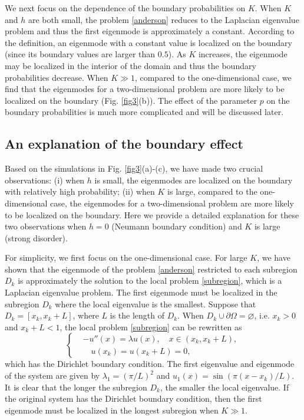 \documentclass[a4paper,11pt]{article}
\begin{document}
We next focus on the dependence of the boundary probabilities on $K$. When $K$ and $h$ are both small, the problem \eqref{anderson} reduces to the Laplacian eigenvalue problem and thus the first eigenmode is approximately a constant. According to the definition, an eigenmode with a constant value is localized on the boundary (since its boundary values are larger than $0.5$). As $K$ increases, the eigenmode may be localized in the interior of the domain and thus the boundary probabilities decrease. When $K\gg 1$, compared to the one-dimensional case, we find that the eigenmodes for a two-dimensional problem are more likely to be localized on the boundary (Fig. \ref{fig3}(b)). The effect of the parameter $p$ on the boundary probabilities is much more complicated and will be discussed later.

\subsection{An explanation of the boundary effect}
Based on the simulations in Fig. \ref{fig3}(a)-(c), we have made two crucial observations: (i) when $h$ is small, the eigenmodes are localized on the boundary with relatively high probability; (ii) when $K$ is large, compared to the one-dimensional case, the eigenmodes for a two-dimensional problem are more likely to be localized on the boundary. Here we provide a detailed explanation for these two observations when $h = 0$ (Neumann boundary condition) and $K$ is large (strong disorder).

For simplicity, we first focus on the one-dimensional case. For large $K$, we have shown that the eigenmode of the problem \eqref{anderson} restricted to each subregion $D_k$ is approximately the solution to the local problem \eqref{subregion}, which is a Laplacian eigenvalue problem. The first eigenmode must be localized in the subregion $D_k$ where the local eigenvalue is the smallest. Suppose that $D_k = [x_k, x_k+L]$, where $L$ is the length of $D_k$. When $D_k \cup \partial \Omega = \varnothing$, i.e. $x_k>0$ and $x_k+L<1$, the local problem \eqref{subregion} can be rewritten as
\begin{equation}\label{regionD}
\left\{
\begin{split}
& - u''(x) = \lambda u(x), \quad x \in (x_k, x_k+L), \\
& \quad u(x_k) = u(x_k+L) = 0,
\end{split}
\right.
\end{equation}
which has the Dirichlet boundary condition. The first eigenvalue and eigenmode of the system are given by $\lambda_1 = (\pi/L)^2$ and $u_1(x) = \sin(\pi(x-x_k)/L)$. It is clear that the longer the subregion $D_k$, the smaller the local eigenvalue. If the original system has the Dirichlet boundary condition, then the first eigenmode must be localized in the longest subregion when $K\gg 1$.
\end{document}
